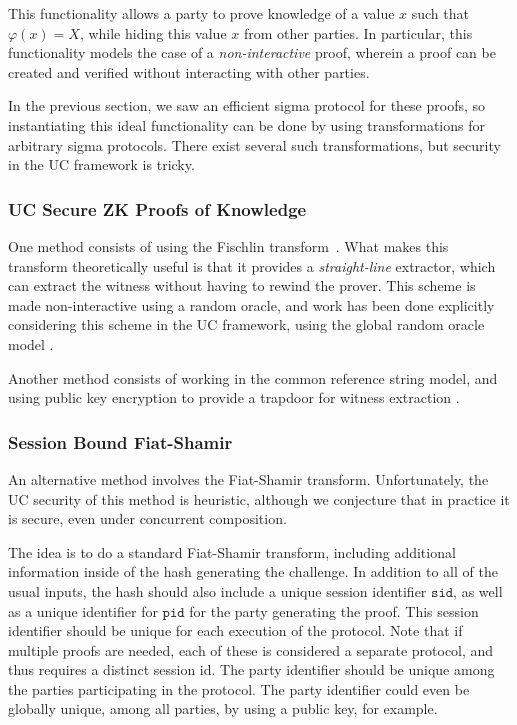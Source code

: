 This functionality allows a party to prove knowledge
of a value $x$ such that $\varphi(x) = X$, while hiding
this value $x$ from other parties.
In particular, this functionality models the case
of a \emph{non-interactive} proof, wherein a proof can
be created and verified without interacting with other parties.

In the previous section, we saw an efficient sigma protocol
for these proofs, so instantiating this ideal functionality
can be done by using transformations for arbitrary sigma protocols.
There exist several such transformations, but security
in the UC framework is tricky.

\subsubsection{UC Secure ZK Proofs of Knowledge}

One method consists of using the Fischlin transform~\cite{fischlin_communication-efficient_2005}.
What makes this transform theoretically useful is that it provides
a \emph{straight-line} extractor, which can extract the witness
without having to rewind the prover.
This scheme is made non-interactive using a random oracle,
and work has been done explicitly considering this scheme in the UC
framework, using the global random oracle model \cite{lysyanskaya_universally_2022}.

Another method consists of working in the common reference string
model, and using public key encryption to provide a trapdoor
for witness extraction \cite{krenn_framework_2011, kosba_cc_2015}.

\subsubsection{Session Bound Fiat-Shamir}

An alternative method involves the Fiat-Shamir \cite{fiat_how_2006} transform.
Unfortunately, the UC security of this method is heuristic,
although we conjecture that in practice it is secure, even
under concurrent composition.

The idea is to do a standard Fiat-Shamir transform, including
additional information inside of the hash generating the challenge.
In addition to all of the usual inputs, the hash should also
include a unique session identifier $\texttt{sid}$, as well as a unique
identifier for $\texttt{pid}$ for the party generating the proof.
This session identifier should be unique for each execution of the protocol.
Note that if multiple proofs are needed, each of these is considered a separate protocol,
and thus requires a distinct session id.
The party identifier should be unique among the parties
participating in the protocol.
The party identifier could even be globally unique,
among all parties,
by using a public key, for example.

